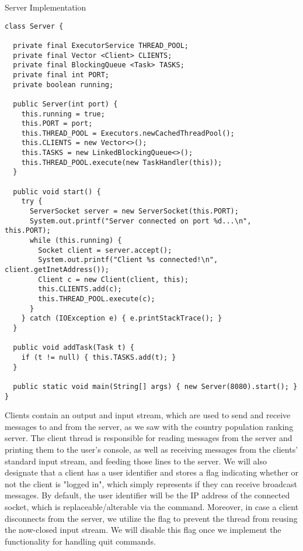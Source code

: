 \begin{cl}{Server Implementation}
\begin{lstlisting}[language=MyJava]
class Server {

  private final ExecutorService THREAD_POOL;
  private final Vector <Client> CLIENTS;
  private final BlockingQueue <Task> TASKS;
  private final int PORT;
  private boolean running;

  public Server(int port) {
    this.running = true;
    this.PORT = port;
    this.THREAD_POOL = Executors.newCachedThreadPool();
    this.CLIENTS = new Vector<>();
    this.TASKS = new LinkedBlockingQueue<>();
    this.THREAD_POOL.execute(new TaskHandler(this));
  }

  public void start() {
    try {
      ServerSocket server = new ServerSocket(this.PORT);
      System.out.printf("Server connected on port %d...\n", this.PORT);
      while (this.running) {
        Socket client = server.accept();
        System.out.printf("Client %s connected!\n", client.getInetAddress());
        Client c = new Client(client, this);
        this.CLIENTS.add(c);
        this.THREAD_POOL.execute(c);
      }
    } catch (IOException e) { e.printStackTrace(); }
  }

  public void addTask(Task t) {
    if (t != null) { this.TASKS.add(t); }
  }

  public static void main(String[] args) { new Server(8080).start(); }
}
\end{lstlisting}
\end{cl}

Clients contain an output and input stream, which are used to send and receive messages to and from the server, as we saw with the country population ranking server. The client thread is responsible for reading messages from the server and printing them to the user's console, as well as receiving messages from the clients' standard input stream, and feeding those lines to the server. We will also designate that a client has a user identifier and stores a flag indicating whether or not the client is "logged in", which simply represents if they can receive broadcast messages. By default, the user identifier will be the IP address of the connected socket, which is replaceable/alterable via the  command. Moreover, in case a client disconnects from the server, we utilize the  flag to prevent the thread from reusing the now-closed input stream. We will disable this flag once we implement the functionality for handling quit commands.

